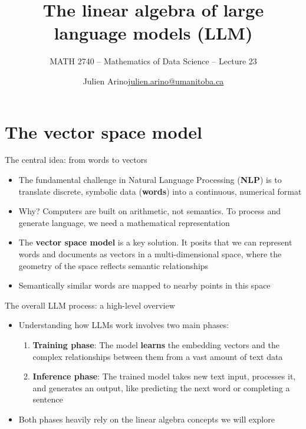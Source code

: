 \documentclass[aspectratio=169]{beamer}\usepackage[]{graphicx}\usepackage[]{xcolor}
\subtitle{MATH 2740 -- Mathematics of Data Science -- Lecture 23}
\author{\texorpdfstring{Julien Arino\newline\url{julien.arino@umanitoba.ca}}{Julien Arino}}
\institute{Department of Mathematics @ University of Manitoba}
\title{The linear algebra of large language models (LLM)}
\makeatletter
\newcommand{\defword}[1]{\textbf{\textcolor{beamer@blendedblue}{#1}}}
\makeatother
\begin{document}

\section{The vector space model}

\begin{frame}{The central idea: from words to vectors}
\begin{itemize}
\item The fundamental challenge in Natural Language Processing (\defword{NLP}) is to translate discrete, symbolic data (\defword{words}) into a continuous, numerical format
\vfill
\item Why? Computers are built on arithmetic, not semantics. To process and generate language, we need a mathematical representation
\vfill
\item The \defword{vector space model} is a key solution. It posits that we can represent words and documents as vectors in a multi-dimensional space, where the geometry of the space reflects semantic relationships
\vfill
\item Semantically similar words are mapped to nearby points in this space
\end{itemize}
\end{frame}

\begin{frame}{The overall LLM process: a high-level overview}
\begin{itemize}
    \item Understanding how LLMs work involves two main phases:
    \vfill
    \begin{enumerate}
        \item \textbf{Training phase}: The model \textbf{learns} the embedding vectors and the complex relationships between them from a vast amount of text data
        \vfill
        \item \textbf{Inference phase}: The trained model takes new text input, processes it, and generates an output, like predicting the next word or completing a sentence
    \end{enumerate}
    \vfill
    \item Both phases heavily rely on the linear algebra concepts we will explore
\end{itemize}
\end{frame}
\end{document}
